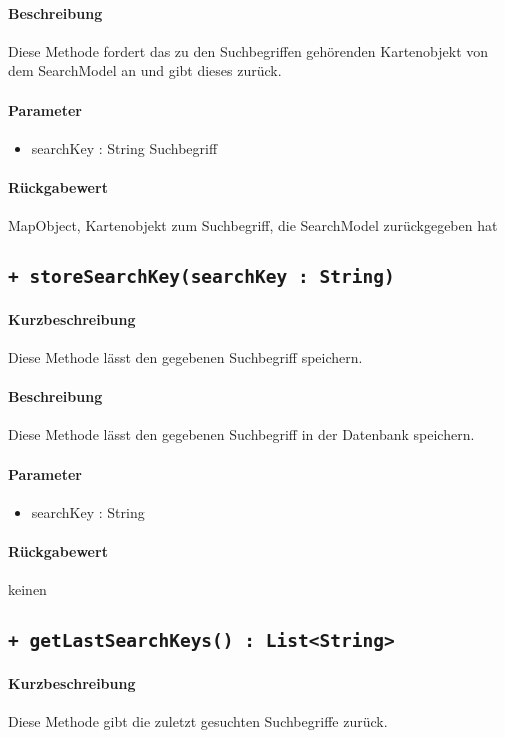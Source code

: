 \paragraph*{Beschreibung}
Diese Methode fordert das zu den Suchbegriffen gehörenden Kartenobjekt von dem SearchModel an und gibt dieses zurück.
\paragraph*{Parameter}
\begin{itemize}
    \item searchKey : String Suchbegriff
\end{itemize}
\paragraph*{Rückgabewert}
MapObject, Kartenobjekt zum Suchbegriff, die SearchModel zurückgegeben hat

\subsection{\texttt{+ storeSearchKey(searchKey : String)}}%
\paragraph*{Kurzbeschreibung}
Diese Methode lässt den gegebenen Suchbegriff speichern.
\paragraph*{Beschreibung}
Diese Methode lässt den gegebenen Suchbegriff in der Datenbank speichern.
\paragraph*{Parameter}
\begin{itemize}
    \item searchKey : String
\end{itemize}
\paragraph*{Rückgabewert}
keinen

\subsection{\texttt{+ getLastSearchKeys() : List<String>}}%
\paragraph*{Kurzbeschreibung}
Diese Methode gibt die zuletzt gesuchten Suchbegriffe zurück.
